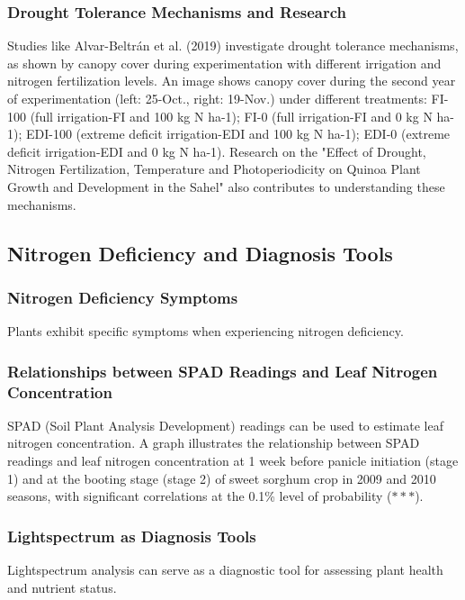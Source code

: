 \subsubsection*{Drought Tolerance Mechanisms and Research} 
Studies like Alvar-Beltrán et al. (2019) investigate drought tolerance mechanisms, as shown by canopy cover during experimentation with different irrigation and nitrogen fertilization levels. An image shows canopy cover during the second year of experimentation (left: 25-Oct., right: 19-Nov.) under different treatments: FI-100 (full irrigation-FI and 100 kg N ha-1); FI-0 (full irrigation-FI and 0 kg N ha-1); EDI-100 (extreme deficit irrigation-EDI and 100 kg N ha-1); EDI-0 (extreme deficit irrigation-EDI and 0 kg N ha-1). Research on the "Effect of Drought, Nitrogen Fertilization, Temperature and Photoperiodicity on Quinoa Plant Growth and Development in the Sahel" also contributes to understanding these mechanisms.

\subsection{Nitrogen Deficiency and Diagnosis Tools} 
\subsubsection*{Nitrogen Deficiency Symptoms} 
Plants exhibit specific symptoms when experiencing nitrogen deficiency.

\subsubsection*{Relationships between SPAD Readings and Leaf Nitrogen Concentration} 
SPAD (Soil Plant Analysis Development) readings can be used to estimate leaf nitrogen concentration. A graph illustrates the relationship between SPAD readings and leaf nitrogen concentration at 1 week before panicle initiation (stage 1) and at the booting stage (stage 2) of sweet sorghum crop in 2009 and 2010 seasons, with significant correlations at the 0.1\% level of probability ($***$).

\subsubsection*{Lightspectrum as Diagnosis Tools} 
Lightspectrum analysis can serve as a diagnostic tool for assessing plant health and nutrient status.

